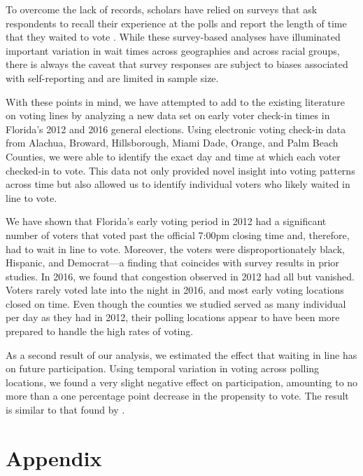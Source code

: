 \documentclass[12pt,titlepage]{article}
\begin{document}
To overcome the lack of records, scholars have relied on surveys that
ask respondents to recall their experience at the polls and report the
length of time that they waited to vote
\citep{stewart:waitingtovote2012, pettigrew:racegapwaittimes}.  While
these survey-based analyses have illuminated important variation in
wait times across geographies and across racial groups, there is
always the caveat that survey responses are subject to biases
associated with self-reporting and are limited in sample size.

With these points in mind, we have attempted to add to the existing
literature on voting lines by analyzing a new data set on early voter
check-in times in Florida's 2012 and 2016 general elections. Using
electronic voting check-in data from Alachua, Broward, Hillsborough,
Miami Dade, Orange, and Palm Beach Counties, we were able to identify
the exact day and time at which each voter checked-in to vote.  This
data not only provided novel insight into voting patterns across time
but also allowed us to identify individual voters who likely waited in
line to vote.

We have shown that Florida's early voting period in 2012 had a
significant number of voters that voted past the official 7:00pm
closing time and, therefore, had to wait in line to vote.  Moreover,
the voters were disproportionately black, Hispanic, and Democrat---a
finding that coincides with survey results in prior studies.  In 2016,
we found that congestion observed in 2012 had all but vanished.
Voters rarely voted late into the night in 2016, and most early voting
locations closed on time.  Even though the counties we studied served
as many individual per day as they had in 2012, their polling
locations appear to have been more prepared to handle the high rates
of voting.
  
As a second result of our analysis, we estimated the effect that
waiting in line has on future participation.  Using temporal variation
in voting across polling locations, we found a very slight negative
effect on participation, amounting to no more than a one percentage
point decrease in the propensity to vote. The result is similar to
that found by \citet{pettigrew:racegapwaittimes}.

% 

\clearpage
\newpage





\newpage
\appendix
\section*{Appendix}

 
\end{document}
